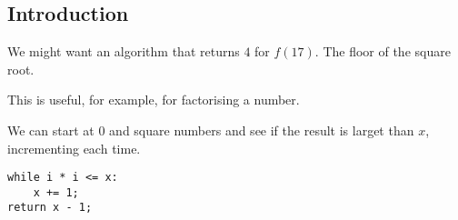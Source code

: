 
\subsection{Introduction}

We might want an algorithm that returns \(4\) for \(f(17)\). The floor of the square root.

This is useful, for example, for factorising a number.

We can start at \(0\) and square numbers and see if the result is larget than \(x\), incrementing each time.

\begin{verbatim}
while i * i <= x:
    x += 1;
return x - 1;
\end{verbatim}

